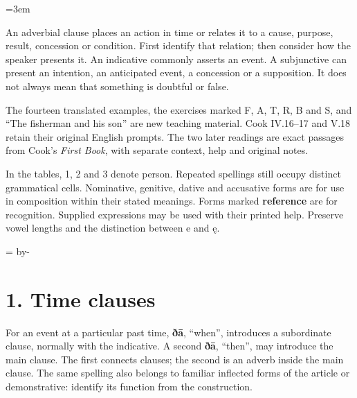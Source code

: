 \BookRecto
\begingroup
\renewcommand{\runningtitle}{Unit 11. Adverbial clauses}
\emergencystretch=3em
\newcommand{\itempara}[2]{\par\addvspace{3pt}\noindent\hangindent=1.8em\hangafter=1\makebox[1.8em][l]{#1.}#2\par}
\newcommand{\reserve}[1]{\par\penalty-100\begingroup\dimen0=\pagegoal\advance\dimen0 by-\pagetotal\ifdim\dimen0<#1\newpage\fi\endgroup}

\raggedright
{}

An adverbial clause places an action in time or relates it to a cause, purpose, result, concession or condition. First identify that relation; then consider how the speaker presents it. An indicative commonly asserts an event. A subjunctive can present an intention, an anticipated event, a concession or a supposition. It does not always mean that something is doubtful or false.

The fourteen translated examples, the exercises marked F, A, T, R, B and S, and “The fisherman and his son” are new teaching material. Cook IV.16–17 and V.18 retain their original English prompts. The two later readings are exact passages from Cook’s \emph{First Book}, with separate context, help and original notes.

In the tables, 1, 2 and 3 denote person. Repeated spellings still occupy distinct grammatical cells. Nominative, genitive, dative and accusative forms are for use in composition within their stated meanings. Forms marked \textbf{reference} are for recognition. Supplied expressions may be used with their printed help. Preserve vowel lengths and the distinction between e and ę.

\reserve{7\baselineskip}
\section*{1. Time clauses}

For an event at a particular past time, \textbf{ðā}, “when”, introduces a subordinate clause, normally with the indicative. A second \textbf{ðā}, “then”, may introduce the main clause. The first connects clauses; the second is an adverb inside the main clause. The same spelling also belongs to familiar inflected forms of the article or demonstrative: identify its function from the construction.

